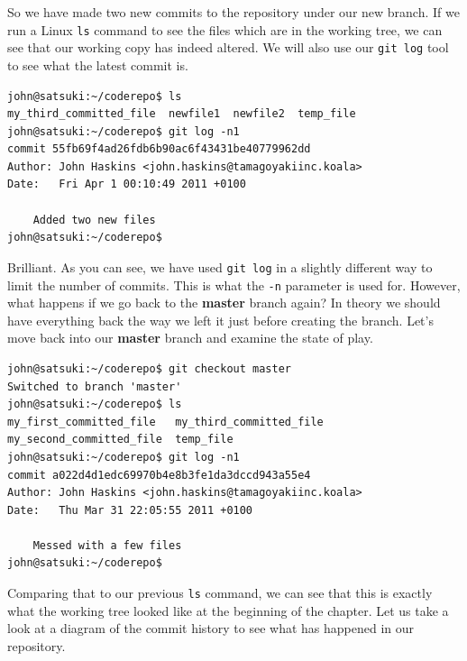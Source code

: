 So we have made two new commits to the repository under our new branch.
If we run a Linux \texttt{ls} command to see the files which are in the working tree, we can see that our working copy has indeed altered.
We will also use our \texttt{git log} tool to see what the latest commit is.

\begin{Verbatim}
john@satsuki:~/coderepo$ ls
my_third_committed_file  newfile1  newfile2  temp_file
john@satsuki:~/coderepo$ git log -n1
commit 55fb69f4ad26fdb6b90ac6f43431be40779962dd
Author: John Haskins <john.haskins@tamagoyakiinc.koala>
Date:   Fri Apr 1 00:10:49 2011 +0100

    Added two new files
john@satsuki:~/coderepo$
\end{Verbatim}

Brilliant.
As you can see, we have used \texttt{git log} in a slightly different way to limit the number of commits.
This is what the \texttt{-n} parameter is used for.
However, what happens if we go back to the \textbf{master} branch again?  In theory we should have everything back the way we left it just before creating the branch.
Let's move back into our \textbf{master} branch and examine the state of play.

\begin{Verbatim}
john@satsuki:~/coderepo$ git checkout master
Switched to branch 'master'
john@satsuki:~/coderepo$ ls
my_first_committed_file   my_third_committed_file
my_second_committed_file  temp_file
john@satsuki:~/coderepo$ git log -n1
commit a022d4d1edc69970b4e8b3fe1da3dccd943a55e4
Author: John Haskins <john.haskins@tamagoyakiinc.koala>
Date:   Thu Mar 31 22:05:55 2011 +0100

    Messed with a few files
john@satsuki:~/coderepo$
\end{Verbatim}

Comparing that to our previous \texttt{ls} command, we can see that this is exactly what the working tree looked like at the beginning of the chapter.
Let us take a look at a diagram of the commit history to see what has happened in our repository.

